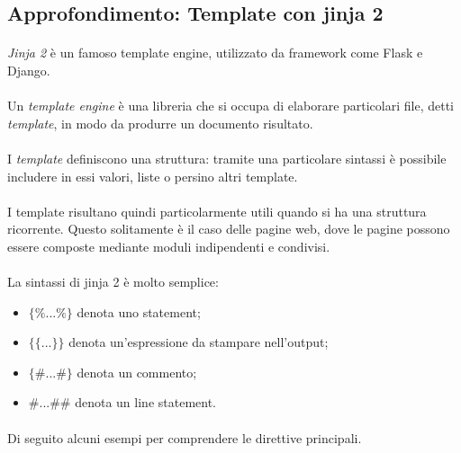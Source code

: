 \documentclass[12pt,a4paper,twoside,english,italian]{book}
\begin{document}
\subsection{Approfondimento: Template con jinja 2}

\paragraph{} \emph{Jinja 2} \cite{jinja} è un famoso template engine, utilizzato da framework come Flask e Django.

\paragraph{} Un \emph{template engine} è una libreria che si occupa di elaborare particolari file, detti \emph{template}, in modo da produrre un documento risultato. 

\paragraph{} I \emph{template} definiscono una struttura: tramite una particolare sintassi è possibile includere in essi valori, liste o persino altri template. 

\paragraph{} I template risultano quindi particolarmente utili quando si ha una struttura ricorrente. Questo solitamente è il caso delle pagine web, dove le pagine possono essere composte mediante moduli indipendenti e condivisi.

\paragraph{} La sintassi di jinja 2 è molto semplice:
\begin{itemize}
    \item $\{\% ... \%\}$ denota uno statement;
    \item $\{\{ ... \}\}$ denota un'espressione da stampare nell'output;
    \item $\{\# ... \#\}$ denota un commento;
    \item $\# ... \#\#$ denota un line statement.
\end{itemize}

\paragraph{} Di seguito alcuni esempi per comprendere le direttive principali.
\end{document}
